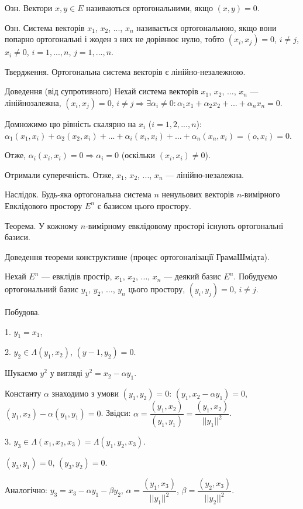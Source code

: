 Озн. Вектори $x, y \in E$ називаються ортогональними, якщо $(x, y) = 0$. 

Озн. Система векторів $x_1$, $x_2$, ..., $x_n$ називається ортогональною, якщо вони
попарно ортогональні і жоден з них не дорівнює нулю, тобто
$(x_i, x_j) = 0$, $i \neq j$, $x_i \neq 0$, $i = 1, ..., n$, $j = 1, ..., n$.

Твердження. Ортогональна система векторів є лінійно-незалежною.

Доведення (від супротивного) Нехай система векторів $x_1$, $x_2$, ..., $x_n$ --- лінійнозалежна,
$(x_i, x_j) = 0$, $i \neq j \Rightarrow \exists \alpha_i \neq 0: \alpha_1 x_1 + \alpha_2 x_2 + ... + \alpha_n x_n = 0$.

Домножимо цю рівність скалярно на $x_i$ ($i = 1, 2, ..., n$):
$\alpha_1(x_1,x_i) + \alpha_2(x_2,x_i) + ... + \alpha_i(x_i,x_i) + ... + \alpha_n(x_n,x_i) = (o, x_i) = 0$.

Отже, $\alpha_i(x_i,x_i) = 0 \Rightarrow \alpha_i = 0$ (оскільки $(x_i,x_i) \neq 0$).

Отримали суперечність. Отже, $x_1$, $x_2$, ..., $x_n$ --- лінійно-незалежна.

Наслідок. Будь-яка ортогональна система $n$ ненульових векторів $n$-вимірного
Евклідового простору $E^n$ є базисом цього простору.

Теорема. У кожному $n$-вимірному евклідовому просторі існують
ортогональні базиси.

Доведення теореми конструктивне (процес ортогоналізації ГрамаШмідта).

Нехай $E^n$ --- евклідів простір, $x_1$, $x_2$, ..., $x_n$ --- деякий базис $E^n$. Побудуємо
ортогональний базис $y_1$, $y_2$, ..., $y_n$ цього простору, $(y_i, y_j) = 0$, $i \neq j$.

Побудова.

1. $y_1 = x_1$,

2. $y_2 \in \Lambda(y_1, x_2)$, $(y-1, y_2) = 0$.

Шукаємо $y^2$ у вигляді $y^2 = x_2 - \alpha y_1$.

Константу $\alpha$ знаходимо з умови $(y_1, y_2) = 0$: $(y_1, x_2 - \alpha y_1) = 0$,
$(y_1, x_2) - \alpha(y_1, y_1) = 0$. Звідси: $\alpha = \dfrac{(y_1,x_2)}{(y_1,y_1)} = \dfrac{(y_1,x_2)}{||y_1||^2}$.


3. $y_3 \in \Lambda(x_1, x_2, x_3) = \Lambda(y_1, y_2, x_3)$.

$(y_3, y_1) = 0$, $(y_3, y_2) = 0$.

Аналогічно: $y_3 = x_3 - \alpha y_1 - \beta y_2$, $\alpha = \dfrac{(y_1, x_3)}{||y_1||^2}$,
$\beta = \dfrac{(y_2, x_3)}{||y_2||^2}$.

